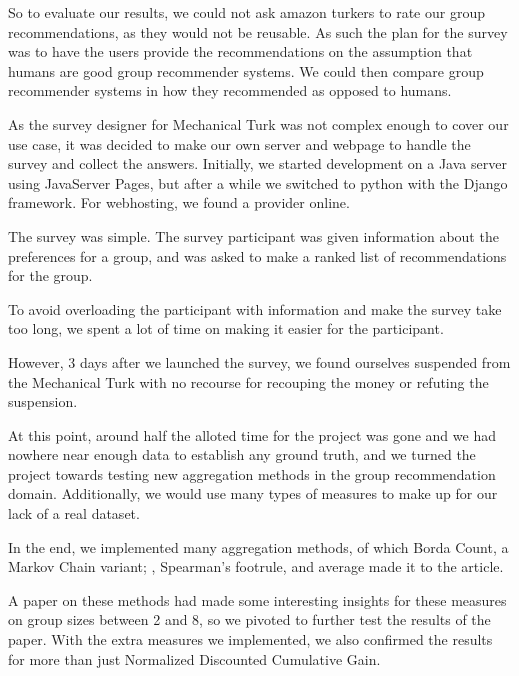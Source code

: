 \begin{titlepage}
\begin{adjustwidth*}{1.9cm}{1.9cm}
So to evaluate our results, we could not ask amazon turkers to rate our group recommendations, as they would not be reusable. As such the plan for the survey was to have the users provide the recommendations on the assumption that humans are good group recommender systems. We could then compare group recommender systems in how they recommended as opposed to humans.

As the survey designer for Mechanical Turk was not complex enough to cover our use case, it was decided to make our own server and webpage to handle the survey and collect the answers. Initially, we started development on a Java server using JavaServer Pages, but after a while we switched to python with the Django framework. For webhosting, we found a provider online.

The survey was simple. The survey participant was given information about the preferences for a group, and was asked to make a ranked list of recommendations for the group.

To avoid overloading the participant with information and make the survey take too long, we spent a lot of time on making it easier for the participant.

However, 3 days after we launched the survey, we found ourselves suspended from the Mechanical Turk with no recourse for recouping the money or refuting the suspension.

At this point, around half the alloted time for the project was gone and we had nowhere near enough data to establish any ground truth, and we turned the project towards testing new aggregation methods in the group recommendation domain. Additionally, we would use many types of measures to make up for our lack of a real dataset.

In the end, we implemented many aggregation methods, of which Borda Count, a Markov Chain variant; \MC, Spearman's footrule, and average made it to the article.

A paper on these methods had made some interesting insights for these measures on group sizes between 2 and 8, so we pivoted to further test the results of the paper. With the extra measures we implemented, we also confirmed the results for more than just Normalized Discounted Cumulative Gain.

\end{adjustwidth*}
\end{titlepage}